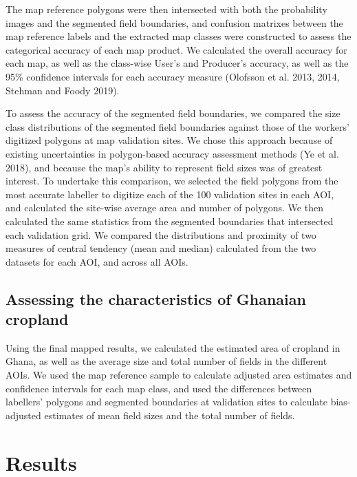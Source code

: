 \documentclass[11pt,a4paper]{article}
\begin{document}
The map reference polygons were then intersected with both the
probability images and the segmented field boundaries, and confusion
matrixes between the map reference labels and the extracted map classes
were constructed to assess the categorical accuracy of each map product.
We calculated the overall accuracy for each map, as well as the
class-wise User's and Producer's accuracy, as well as the 95\%
confidence intervals for each accuracy measure (Olofsson et al. 2013,
2014, Stehman and Foody 2019).

To assess the accuracy of the segmented field boundaries, we compared
the size class distributions of the segmented field boundaries against
those of the workers' digitized polygons at map validation sites. We
chose this approach because of existing uncertainties in polygon-based
accuracy assessment methods (Ye et al. 2018), and because the map's
ability to represent field sizes was of greatest interest. To undertake
this comparison, we selected the field polygons from the most accurate
labeller to digitize each of the 100 validation sites in each AOI, and
calculated the site-wise average area and number of polygons. We then
calculated the same statistics from the segmented boundaries that
intersected each validation grid. We compared the distributions and
proximity of two measures of central tendency (mean and median)
calculated from the two datasets for each AOI, and across all AOIs.

\hypertarget{assessing-the-characteristics-of-ghanaian-cropland}{%
\subsection{Assessing the characteristics of Ghanaian
cropland}\label{assessing-the-characteristics-of-ghanaian-cropland}}

Using the final mapped results, we calculated the estimated area of
cropland in Ghana, as well as the average size and total number of
fields in the different AOIs. We used the map reference sample to
calculate adjusted area estimates and confidence intervals for each map
class, and used the differences between labellers' polygons and
segmented boundaries at validation sites to calculate bias-adjusted
estimates of mean field sizes and the total number of fields.

\hypertarget{results}{%
\section{Results}\label{results}}
\end{document}
